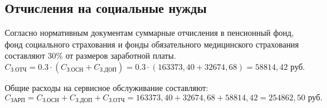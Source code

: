 \subsection{Отчисления на социальные нужды} \label{service_social_fee}

Согласно нормативным документам суммарные отчисления в  пенсионный фонд, фонд социального страхования и фонды обязательного медицинского страхования составляют 30\% от размеров заработной платы.
\begin{equation}
  \label{eq:salary_taxes}
C_\textrm{З.ОТЧ} = 0.3 \cdot (C_\textrm{З.ОСН} + C_\textrm{З.ДОП}) = 0.3 \cdot (163373,40 + 32674,68) = 58814,42 \textrm{ руб.}
\end{equation}

Общие расходы на сервисное обслуживание составляют:
\begin{equation}
  \label{eq:salary_sum}
C_\textrm{ЗАРП} = C_\textrm{З.ОСН} + C_\textrm{З.ДОП} + C_\textrm{З.ОТЧ} = 163373,40 + 32674,68 + 58814,42 =  254862,50 \textrm{ руб.}
\end{equation}